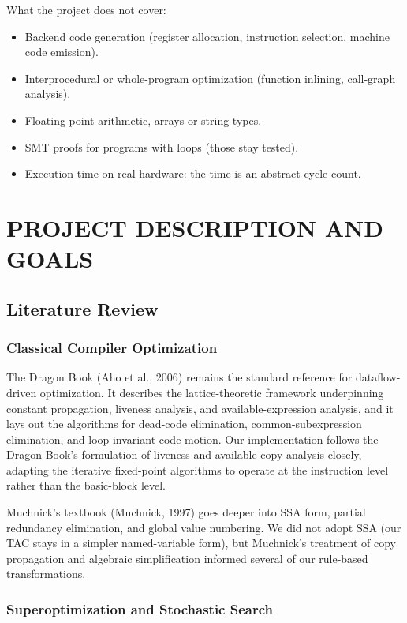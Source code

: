\documentclass[12pt,a4paper]{report}
\begin{document}
What the project does not cover:
\begin{itemize}[leftmargin=2cm]
  \item Backend code generation (register allocation, instruction selection, machine code emission).
  \item Interprocedural or whole-program optimization (function inlining, call-graph analysis).
  \item Floating-point arithmetic, arrays or string types.
  \item SMT proofs for programs with loops (those stay tested).
  \item Execution time on real hardware: the time is an abstract cycle count.
\end{itemize}


\chapter{PROJECT DESCRIPTION AND GOALS}

\section{Literature Review}

\subsection{Classical Compiler Optimization}

The Dragon Book (Aho et al., 2006) remains the standard reference for dataflow-driven optimization. It describes the lattice-theoretic framework underpinning constant propagation, liveness analysis, and available-expression analysis, and it lays out the algorithms for dead-code elimination, common-subexpression elimination, and loop-invariant code motion. Our implementation follows the Dragon Book's formulation of liveness and available-copy analysis closely, adapting the iterative fixed-point algorithms to operate at the instruction level rather than the basic-block level.

Muchnick's textbook (Muchnick, 1997) goes deeper into SSA form, partial redundancy elimination, and global value numbering. We did not adopt SSA (our TAC stays in a simpler named-variable form), but Muchnick's treatment of copy propagation and algebraic simplification informed several of our rule-based transformations.

\subsection{Superoptimization and Stochastic Search}
\end{document}
